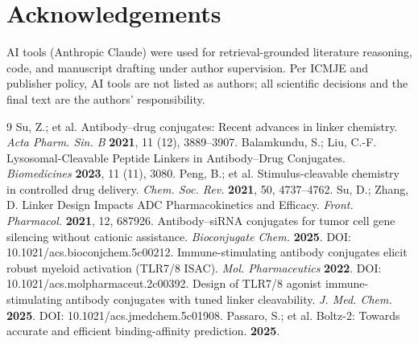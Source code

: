 \documentclass[10pt]{article}
\begin{document}
\section*{Acknowledgements}
AI tools (Anthropic Claude) were used for retrieval-grounded literature reasoning, code, and manuscript drafting under author supervision. Per ICMJE and publisher policy, AI tools are not listed as authors; all scientific decisions and the final text are the authors' responsibility.
\begin{thebibliography}{9}
 Su, Z.; et al. Antibody--drug conjugates: Recent advances in linker chemistry. \emph{Acta Pharm. Sin. B} \textbf{2021}, 11 (12), 3889--3907.
 Balamkundu, S.; Liu, C.-F. Lysosomal-Cleavable Peptide Linkers in Antibody--Drug Conjugates. \emph{Biomedicines} \textbf{2023}, 11 (11), 3080.
 Peng, B.; et al. Stimulus-cleavable chemistry in controlled drug delivery. \emph{Chem. Soc. Rev.} \textbf{2021}, 50, 4737--4762.
 Su, D.; Zhang, D. Linker Design Impacts ADC Pharmacokinetics and Efficacy. \emph{Front. Pharmacol.} \textbf{2021}, 12, 687926.
 Antibody--siRNA conjugates for tumor cell gene silencing without cationic assistance. \emph{Bioconjugate Chem.} \textbf{2025}. DOI: 10.1021/acs.bioconjchem.5c00212.
 Immune-stimulating antibody conjugates elicit robust myeloid activation (TLR7/8 ISAC). \emph{Mol. Pharmaceutics} \textbf{2022}. DOI: 10.1021/acs.molpharmaceut.2c00392.
 Design of TLR7/8 agonist immune-stimulating antibody conjugates with tuned linker cleavability. \emph{J. Med. Chem.} \textbf{2025}. DOI: 10.1021/acs.jmedchem.5c01908.
 Passaro, S.; et al. Boltz-2: Towards accurate and efficient binding-affinity prediction. \textbf{2025}.
\end{thebibliography}
\end{document}
